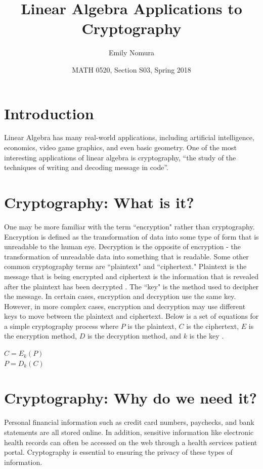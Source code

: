 \documentclass{article}
\title{Linear Algebra Applications to Cryptography}
\author{Emily Nomura}
\date{MATH 0520, Section S03, Spring 2018}
\begin{document}
\maketitle

\section{Introduction}
Linear Algebra has many real-world applications, including artificial intelligence, economics, video game graphics, and even basic geometry. One of the most interesting applications of linear algebra is cryptography, “the study of the techniques of writing and decoding message in code”\cite{ref1:1}. 

\section{Cryptography: What is it?}
 One may be more familiar with the term ``encryption" rather than cryptography. Encryption is defined as the transformation of data into some type of form that is unreadable to the human eye. Decryption is the opposite of encryption - the transformation of unreadable data into something that is readable. Some other common cryptography terms are ``plaintext" and ``ciphertext." Plaintext is the message that is being encrypted and ciphertext is the information that is revealed after the plaintext has been decrypted \cite{ref1:1}. The ``key" is the method used to decipher the message. In certain cases, encryption and decryption use the same key. However, in more complex cases, encryption and decryption may use different keys to move between the plaintext and ciphertext. Below is a set of equations for a simple cryptography process where $P$ is the plaintext, $C$ is the ciphertext, $E$ is the encryption method, $D$ is the decryption method, and $k$ is the key \cite{ref2:2}.

{\center $C = E_{k}(P)$\\
$P = D_{k}(C)$
\endcenter}

\section{Cryptography: Why do we need it?}
Personal financial information such as credit card numbers, paychecks, and bank statements are all stored online. In addition, sensitive information like electronic health records can often be accessed on the web through a health services patient portal. Cryptography is essential to ensuring the privacy of these types of information.\\
\end{document}
